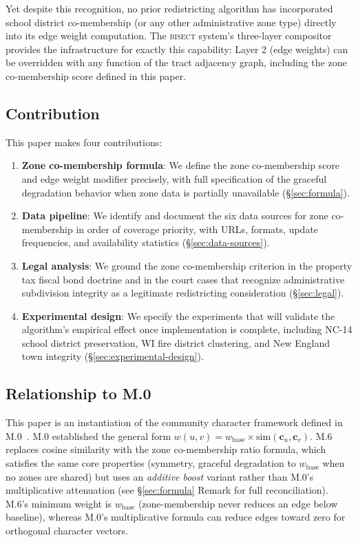 Yet despite this recognition, no prior redistricting algorithm has incorporated
school district co-membership (or any other administrative zone type) directly
into its edge weight computation.
The \textsc{bisect} system's three-layer compositor provides the infrastructure
for exactly this capability: Layer 2 (edge weights) can be overridden with any
function of the tract adjacency graph, including the zone co-membership score
defined in this paper.

\subsection{Contribution}

This paper makes four contributions:
\begin{enumerate}
  \item \textbf{Zone co-membership formula}: We define the zone co-membership
    score and edge weight modifier precisely, with full specification of the
    graceful degradation behavior when zone data is partially unavailable
    (\S\ref{sec:formula}).
  \item \textbf{Data pipeline}: We identify and document the six data sources
    for zone co-membership in order of coverage priority, with URLs, formats,
    update frequencies, and availability statistics
    (\S\ref{sec:data-sources}).
  \item \textbf{Legal analysis}: We ground the zone co-membership criterion
    in the property tax fiscal bond doctrine and in the court cases that
    recognize administrative subdivision integrity as a legitimate redistricting
    consideration (\S\ref{sec:legal}).
  \item \textbf{Experimental design}: We specify the experiments that will
    validate the algorithm's empirical effect once implementation is complete,
    including NC-14 school district preservation, WI fire district clustering,
    and New England town integrity (\S\ref{sec:experimental-design}).
\end{enumerate}

\subsection{Relationship to M.0}

This paper is an instantiation of the community character framework defined in
M.0~\citep{m0framework}.
M.0 established the general form $w(u,v) = w_{\mathrm{base}} \times \mathrm{sim}(\mathbf{c}_u, \mathbf{c}_v)$.
M.6 replaces cosine similarity with the zone co-membership ratio formula, which
satisfies the same core properties (symmetry, graceful degradation to $w_{\mathrm{base}}$ when no zones are shared) but uses an \emph{additive boost} variant rather than M.0's multiplicative attenuation (see \S\ref{sec:formula} Remark for full reconciliation).
M.6's minimum weight is $w_{\mathrm{base}}$ (zone-membership never reduces an edge below baseline),
whereas M.0's multiplicative formula can reduce edges toward zero for orthogonal character vectors.

